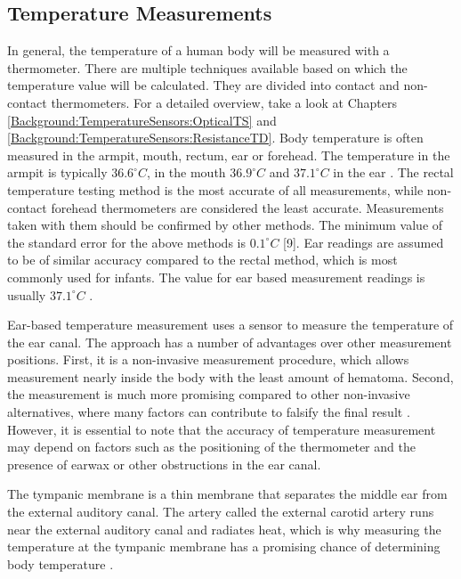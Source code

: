 \subsection{Temperature Measurements}
\label{Background:BodyTemperature:TemperatureMeasurements}
In general, the temperature of a human body will be measured with a thermometer.
There are multiple techniques available based on which the temperature value will be calculated. 
They are divided into contact and non-contact thermometers.
For a detailed overview, take a look at Chapters \ref{Background:TemperatureSensors:OpticalTS} and \ref{Background:TemperatureSensors:ResistanceTD}.
Body temperature is often measured in the armpit, mouth, rectum, ear or forehead.
The temperature in the armpit is typically $36.6^\circ C$, in the mouth $36.9^\circ C$ and $37.1^\circ C$ in the ear \cite{dolibogComparativeAnalysisHuman2022}.
The rectal temperature testing method is the most accurate of all measurements, while non-contact forehead thermometers are considered the least accurate.
Measurements taken with them should be confirmed by other methods.
The minimum value of the standard error for the above methods is $0.1^\circ C$ [9].
Ear readings are assumed to be of similar accuracy compared to the rectal method, which is most commonly used for infants.
The value for ear based measurement readings is usually $37.1^\circ C$ \cite{dolibogComparativeAnalysisHuman2022}.

Ear-based temperature measurement uses a sensor to measure the temperature of the ear canal. 
The approach has a number of advantages over other measurement positions.
First, it is a non-invasive measurement procedure, which allows measurement nearly inside the body with the least amount of hematoma.
Second, the measurement is much more promising compared to other non-invasive alternatives, where many factors can contribute to falsify the final result \cite{ganioValidityReliabilityDevices2009, craigTemperatureMeasuredAxilla2000}. 
However, it is essential to note that the accuracy of temperature measurement may depend on factors such as the positioning of the thermometer and the presence of earwax or other obstructions in the ear canal.

The tympanic membrane is a thin membrane that separates the middle ear from the external auditory canal. 
The artery called the external carotid artery runs near the external auditory canal and radiates heat, which is why measuring the temperature at the tympanic membrane has a promising chance of determining body temperature \cite{yeohRevisitingTympanicMembrane2017}.

